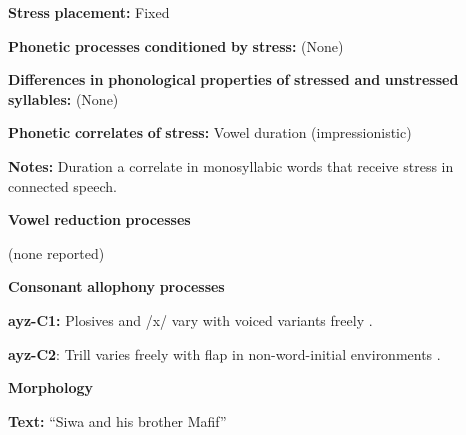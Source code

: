 \documentclass[output=paper]{langsci/langscibook}
\begin{document}
\begin{styleBody}
\textbf{Stress} \textbf{placement:} Fixed
\end{styleBody}

\begin{styleBody}
\textbf{Phonetic} \textbf{processes} \textbf{conditioned} \textbf{by} \textbf{stress:} (None)
\end{styleBody}

\begin{styleBody}
\textbf{Differences} \textbf{in} \textbf{phonological} \textbf{properties} \textbf{of} \textbf{stressed} \textbf{and} \textbf{unstressed} \textbf{syllables:} (None)
\end{styleBody}

\begin{styleBody}
\textbf{Phonetic} \textbf{correlates} \textbf{of} \textbf{stress:} Vowel duration (impressionistic)
\end{styleBody}

\begin{styleBody}
\textbf{Notes:} Duration a correlate in monosyllabic words that receive stress in connected speech.
\end{styleBody}

\begin{styleBody}
\textbf{Vowel} \textbf{reduction} \textbf{processes}
\end{styleBody}

\begin{styleBody}
(none reported)
\end{styleBody}

\begin{styleBody}
\textbf{Consonant} \textbf{allophony} \textbf{processes}
\end{styleBody}

\begin{styleBody}
\textbf{ayz-C1:} Plosives and /x/ vary with voiced variants freely \citep[21-2]{Dol2007}.
\end{styleBody}

\begin{styleBody}
\textbf{ayz-C2}: Trill varies freely with flap in non-word-initial environments \citep[24]{Dol2007}.
\end{styleBody}

\begin{styleBody}
\textbf{Morphology}
\end{styleBody}

\begin{styleBody}
\textbf{Text:} “Siwa and his brother Mafif” \citep[284-291]{Dol2007}
\end{styleBody}
\end{document}
